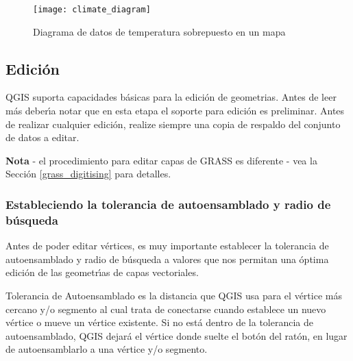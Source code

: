 \begin{figure}[ht]
   \begin{center}
   \caption{Diagrama de datos de temperatura sobrepuesto en un mapa \nixcaption}\label{fig:climatediagram}\smallskip
   \texttt{[image: climate\_diagram]}
\end{center}
\end{figure}

\subsection{Edici\'on}

QGIS suporta capacidades b\'asicas para la edici\'on de geometrias.  Antes de leer más
deber\'{\i}a notar que en esta etapa el soporte para edici\'on es preliminar.
Antes de realizar cualquier edici\'on, realize siempre una copia de respaldo del conjunto de datos
a editar. 

\textbf{Nota} - el procedimiento para editar capas de GRASS es diferente - vea la
Secci\'on \ref{grass_digitising} para detalles.

\subsubsection{Estableciendo la tolerancia de autoensamblado y radio de b\'usqueda}

Antes de poder editar v\'ertices, es muy importante establecer la tolerancia
de autoensamblado y radio de b\'usqueda a valores que nos permitan una \'optima edici\'on de
las geometr\'{\i}as de capas vectoriales. 


Tolerancia de Autoensamblado es la distancia que QGIS usa para  el v\'ertice
más cercano y/o segmento al cual trata de conectarse
cuando establece un nuevo v\'ertice o mueve un v\'ertice existente. Si no est\'a dentro
de la tolerancia de autoensamblado, QGIS dejar\'a el v\'ertice donde suelte el
bot\'on del rat\'on, en lugar de autoensamblarlo a una v\'ertice y/o segmento. 

